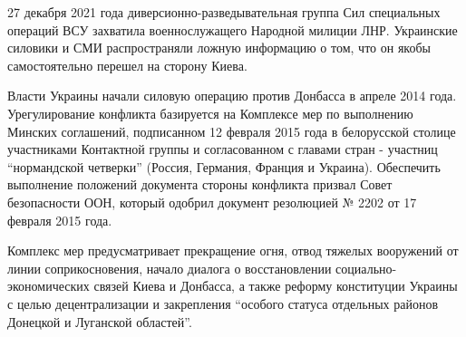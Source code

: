 27 декабря 2021 года диверсионно-разведывательная группа Сил специальных
операций ВСУ захватила военнослужащего Народной милиции ЛНР. Украинские
силовики и СМИ распространяли ложную информацию о том, что он якобы
самостоятельно перешел на сторону Киева.

Власти Украины начали силовую операцию против Донбасса в апреле 2014 года.
Урегулирование конфликта базируется на Комплексе мер по выполнению Минских
соглашений, подписанном 12 февраля 2015 года в белорусской столице участниками
Контактной группы и согласованном с главами стран - участниц \enquote{нормандской
четверки} (Россия, Германия, Франция и Украина). Обеспечить выполнение
положений документа стороны конфликта призвал Совет безопасности ООН, который
одобрил документ резолюцией № 2202 от 17 февраля 2015 года.

Комплекс мер предусматривает прекращение огня, отвод тяжелых вооружений от
линии соприкосновения, начало диалога о восстановлении социально-экономических
связей Киева и Донбасса, а также реформу конституции Украины с целью
децентрализации и закрепления \enquote{особого статуса отдельных районов Донецкой и
Луганской областей}.

